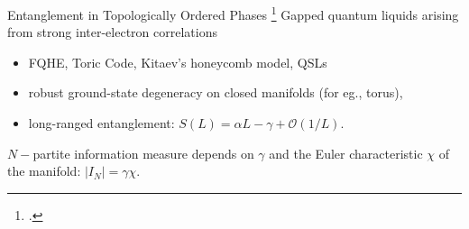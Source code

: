 \documentclass[12pt,aspectratio=169]{beamer}
\begin{document}
\begin{frame}{Entanglement in Topologically Ordered Phases}
	\footcite{wen_1989,kitaev2006topological,Patra2022}
	\alert{Gapped quantum liquids} arising from strong inter-electron correlations\\[10pt]
	\begin{itemize}
		\item FQHE, Toric Code, Kitaev's honeycomb model, QSLs\\[10pt]
		\item robust ground-state \alert{degeneracy} on closed manifolds (for eg., torus),\\[10pt]
	\item \alert{long-ranged} entanglement: \(S(L) = \alpha L - \gamma + \mathcal{O}(1/L)\).\\[10pt]
	\end{itemize}
	\(N-\)partite information measure depends on \(\gamma\) and the Euler characteristic \(\chi\) of the manifold: \(|I_N| = \gamma \chi\).
\end{frame}
\end{document}
